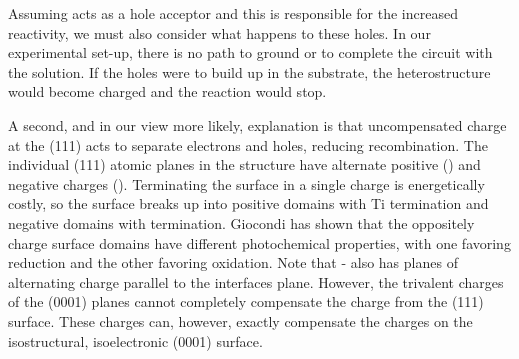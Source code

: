 Assuming  acts as a hole acceptor and this is responsible for the increased reactivity, we must also consider what happens to these holes.  In our experimental set-up, there is no path to ground or to complete the circuit with the solution.  If the holes were to build up in the substrate, the heterostructure would become charged and the reaction would stop.

A second, and in our view more likely, explanation is that uncompensated charge at the (111) acts to separate electrons and holes, reducing recombination.  The individual (111) atomic planes in the  structure have alternate positive () and negative charges ().  Terminating the surface in a single charge is energetically costly, so the surface breaks up into positive domains with Ti termination and negative domains with  termination.  Giocondi\cite{Giocondi:2003wc} has shown that the oppositely charge surface domains have different photochemical properties, with one favoring reduction and the other favoring oxidation.  Note that \textalpha- also has planes of alternating charge parallel to the interfaces plane.  However, the trivalent charges of the (0001) planes cannot completely compensate the charge from the (111) surface.  These charges can, however, exactly compensate the charges on the isostructural, isoelectronic (0001) surface.


